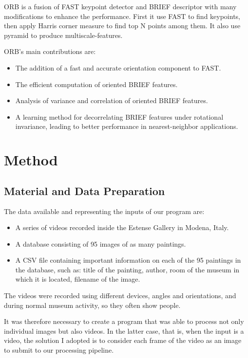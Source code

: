 \documentclass[10pt,twocolumn,letterpaper]{article}
\begin{document}
ORB is a fusion of FAST keypoint detector and BRIEF descriptor with many modifications to enhance the performance. First it use FAST to find keypoints, then apply Harris corner measure to find top N points among them. It also use pyramid to produce multiscale-features.

ORB's main contributions are:
\begin{itemize}
   \item The addition of a fast and accurate orientation component to FAST.
   \item The efficient computation of oriented BRIEF features.
   \item Analysis of variance and correlation of oriented BRIEF features.
   \item A learning method for decorrelating BRIEF features under rotational invariance, leading to better performance in nearest-neighbor applications.
\end{itemize}
 

\section{Method}

\subsection{Material and Data Preparation}

The data available and representing the inputs of our program are:
\begin{itemize}
   \item A series of videos recorded inside the Estense Gallery in Modena, Italy.
   \item A database consisting of 95 images of as many paintings.
   \item A CSV file containing important information on each of the 95 paintings in the database, such as: title of the painting, author, room of the museum in which it is located, filename of the image.
\end{itemize}

The videos were recorded using different devices, angles and orientations, and during normal museum activity, so they often show people.

It was therefore necessary to create a program that was able to process not only individual images but also videos.
In the latter case, that is, when the input is a video, the solution I adopted is to consider each frame of the video as an image to submit to our processing pipeline.
\end{document}
